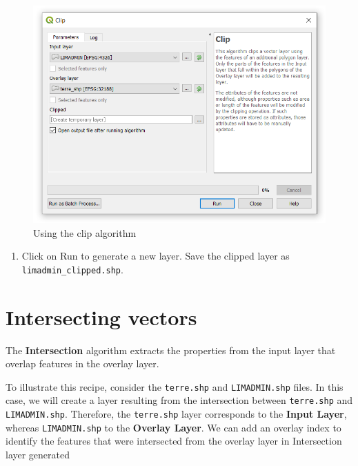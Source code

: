 \documentclass[]{book}
\providecommand{\tightlist}{%
  \setlength{\itemsep}{0pt}\setlength{\parskip}{0pt}}
\theoremstyle{definition}
\theoremstyle{definition}
\theoremstyle{definition}
\theoremstyle{remark}
\begin{document}
\begin{figure}

{\centering \includegraphics[width=10.6in]{figures/Clipping_Vectors_Dialog} 

}

\caption{Using the clip algorithm}\label{fig:unnamed-chunk-20}
\end{figure}

\begin{enumerate}
\def\labelenumi{\arabic{enumi}.}
\setcounter{enumi}{3}
\tightlist
\item
  Click on Run to generate a new layer. Save the clipped layer as
  \texttt{limadmin\_clipped.shp}.
\end{enumerate}

\section{Intersecting vectors}\label{IntersectionVectors}

The \textbf{Intersection} algorithm extracts the properties from the
input layer that overlap features in the overlay layer.

To illustrate this recipe, consider the \texttt{terre.shp} and
\texttt{LIMADMIN.shp} files. In this case, we will create a layer
resulting from the intersection between \texttt{terre.shp} and
\texttt{LIMADMIN.shp}. Therefore, the \texttt{terre.shp} layer
corresponds to the \textbf{Input Layer}, whereas \texttt{LIMADMIN.shp}
to the \textbf{Overlay Layer}. We can add an overlay index to identify
the features that were intersected from the overlay layer in
Intersection layer generated
\end{document}
